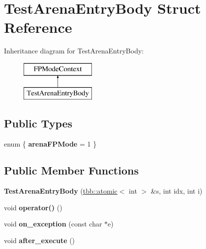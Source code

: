 \hypertarget{structTestArenaEntryBody}{}\section{Test\+Arena\+Entry\+Body Struct Reference}
\label{structTestArenaEntryBody}
Inheritance diagram for Test\+Arena\+Entry\+Body\+:\begin{figure}[H]
\begin{center}
\leavevmode
\includegraphics[height=2.000000cm]{structTestArenaEntryBody}
\end{center}
\end{figure}
\subsection*{Public Types}
\begin{DoxyCompactItemize}
\item 
\hypertarget{structTestArenaEntryBody_a58ff4514c8b0ab6bc8abd7a2a1b1a2a7}{}enum \{ {\bfseries arena\+F\+P\+Mode} = 1
 \}\label{structTestArenaEntryBody_a58ff4514c8b0ab6bc8abd7a2a1b1a2a7}

\end{DoxyCompactItemize}
\subsection*{Public Member Functions}
\begin{DoxyCompactItemize}
\item 
\hypertarget{structTestArenaEntryBody_acb114f9a74231e3da05858ab75646176}{}{\bfseries Test\+Arena\+Entry\+Body} (\hyperlink{structtbb_1_1atomic}{tbb\+::atomic}$<$ int $>$ \&s, int idx, int i)\label{structTestArenaEntryBody_acb114f9a74231e3da05858ab75646176}

\item 
\hypertarget{structTestArenaEntryBody_ae8cb2dc401c564e2cd89cf4b10c5527b}{}void {\bfseries operator()} ()\label{structTestArenaEntryBody_ae8cb2dc401c564e2cd89cf4b10c5527b}

\item 
\hypertarget{structTestArenaEntryBody_a4ab2f41a3cd566c8def5238071daf2c8}{}void {\bfseries on\+\_\+exception} (const char $\ast$e)\label{structTestArenaEntryBody_a4ab2f41a3cd566c8def5238071daf2c8}

\item 
\hypertarget{structTestArenaEntryBody_a7e0f3f41360edd97debc11e076a456c1}{}void {\bfseries after\+\_\+execute} ()\label{structTestArenaEntryBody_a7e0f3f41360edd97debc11e076a456c1}

\end{DoxyCompactItemize}
